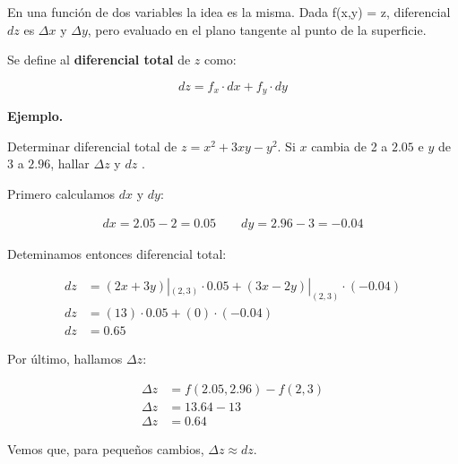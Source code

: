 En una función de dos variables la idea es la misma.
Dada f(x,y) = z, diferencial \(dz\) es \(\Delta x\) y \(\Delta y\),
pero evaluado en el plano tangente al punto de la superficie.

Se define al \textbf{diferencial total} de \(z\) como:

\begin{equation*}
    dz = f_x \cdot dx + f_y \cdot dy
\end{equation*}

\vspace{.5cm}
\textbf{Ejemplo.}

Determinar diferencial total de \(z = x^{2} + 3xy - y^{2}\).
Si \(x\) cambia de 2 a \(2.05\) e \(y\) de 3 a \(2.96\),
hallar \(\Delta z\) y \(dz\) .

Primero calculamos \(dx\) y \(dy\):

\begin{align*}
    dx = 2.05 - 2 = 0.05 \qquad dy = 2.96 - 3 = -0.04
\end{align*}

Deteminamos entonces diferencial total:

\begin{align*}
    dz & = (2x + 3y)|_{(2,3)}\cdot 0.05 + (3x - 2y)|_{(2,3)}\cdot (-0.04) \\
    dz & = (13) \cdot 0.05 + (0) \cdot (-0.04)                            \\
    dz & = \boxed{0.65}
\end{align*}

Por último, hallamos \(\Delta z\):

\begin{align*}
    \Delta z & = f(2.05,2.96) - f(2,3) \\
    \Delta z & = 13.64 - 13 \\
    \Delta z & = \boxed{0.64}
\end{align*}

Vemos que, para pequeños cambios, \(\Delta z \approx dz\).

